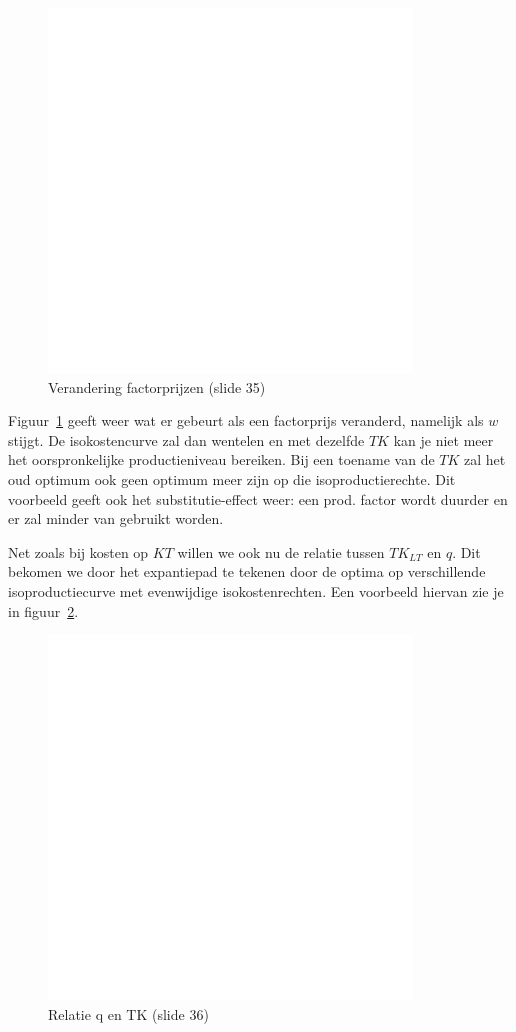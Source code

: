 \begin{figure}[htbp]
	\centering
	\includegraphics[scale=0.4]{Images/white.png}
	\caption{Verandering factorprijzen (slide 35)}
	\label{fig:veranderingFactorprijzen}
\end{figure}
Figuur~\ref{fig:veranderingFactorprijzen} geeft weer wat er gebeurt als een factorprijs veranderd, namelijk als $w$ stijgt. De isokostencurve zal dan wentelen en met dezelfde $TK$ kan je niet meer het oorspronkelijke productieniveau bereiken. Bij een toename van de $TK$ zal het oud optimum ook geen optimum meer zijn op die isoproductierechte. Dit voorbeeld geeft ook het substitutie-effect weer: een prod. factor wordt duurder en er zal minder van gebruikt worden.

Net zoals bij kosten op $KT$ willen we ook nu de relatie tussen $TK_{LT}$ en $q$. Dit bekomen we door het expantiepad te tekenen door de optima op verschillende isoproductiecurve met evenwijdige isokostenrechten. Een voorbeeld hiervan zie je in figuur~\ref{fig:expansiepad}.
\begin{figure}[htbp]
	\centering
	\includegraphics[scale=0.4]{Images/white.png}
	\caption{Relatie q en TK (slide 36)}
	\label{fig:expansiepad}
\end{figure}

